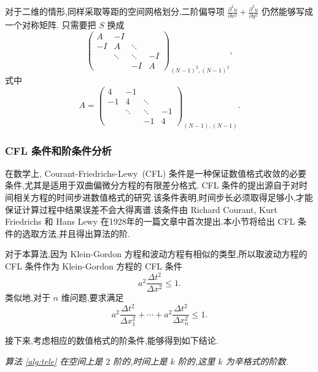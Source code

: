 对于二维的情形,同样采取等距的空间网格划分,二阶偏导项 $\frac{\partial ^2 u}{\partial x^2} + \frac{\partial ^2
u}{\partial y^2}$ 仍然能够写成一个对称矩阵. 只需要把 $S$ 换成
\begin{equation*}
\begin{pmatrix}
A&-I&&\\
-I&A&\ddots&\\
&\ddots&\ddots&-I\\
&&-I&A
\end{pmatrix}_{(N-1)^2,(N-1)^2},
\end{equation*}
式中
\begin{equation*}
A=\begin{pmatrix}
4&-1&&\\
-1&4&\ddots&\\
&\ddots&\ddots&-1\\
&&-1&4
\end{pmatrix}_{(N-1),(N-1)}.
\end{equation*}

\subsubsection{CFL 条件和阶条件分析}
在数学上, Courant-Friedrichs-Lewy~(CFL) 条件是一种保证数值格式收敛的必要条件,尤其是适用于双曲偏微分方程的有限差分格式. CFL 条件的提出源自于对时间相关方程的时间步进数值格式的研究.该条件表明,时间步长必须取得足够小,才能保证计算过程中结果误差不会大得离谱.该条件由 Richard Courant, Kurt Friedrichs 和 Hans Lewy 在1928年的一篇文章中首次提出\cite{courant1967onthe}.本小节将给出 CFL 条件的选取方法,并且得出算法的阶.

对于本算法,因为 Klein-Gordon 方程和波动方程有相似的类型,所以取波动方程的 CFL 条件作为 Klein-Gordon 方程的 CFL 条件
\begin{equation*}
a^2\frac{\Delta t^2}{\Delta x^2}\le 1.
\end{equation*}
类似地,对于 $n$ 维问题,要求满足
\begin{equation*}
a^2 \frac{\Delta t^2}{\Delta x_1^2}+\cdots+a^2 \frac{\Delta t^2}{\Delta x_n^2}\le 1.
\end{equation*}

接下来,考虑相应的数值格式的阶条件,能够得到如下结论.

\begin{theorem}\label{thm:tele}
\emph{算法 \ref{alg:tele} 在空间上是 $2$ 阶的,时间上是 $k$ 阶的,这里 $k$ 为辛格式的阶数.}
\end{theorem}

